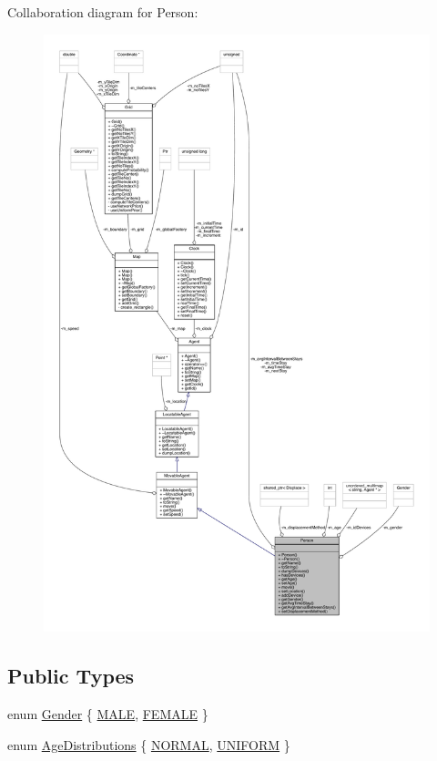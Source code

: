 Collaboration diagram for Person\+:
\nopagebreak
\begin{figure}[H]
\begin{center}
\leavevmode
\includegraphics[width=350pt]{class_person__coll__graph}
\end{center}
\end{figure}
\subsection*{Public Types}
\begin{DoxyCompactItemize}
\item 
enum \mbox{\hyperlink{class_person_aff84ca16bd4dbf364614d86f20b29dd2}{Gender}} \{ \mbox{\hyperlink{class_person_aff84ca16bd4dbf364614d86f20b29dd2a16691f7cc6595f87b71d9b43ad23fcb4}{M\+A\+LE}}, 
\mbox{\hyperlink{class_person_aff84ca16bd4dbf364614d86f20b29dd2a8ee21010fb2d8e8794ef72be368da064}{F\+E\+M\+A\+LE}}
 \}
\item 
enum \mbox{\hyperlink{class_person_a53376a9a5852ec7760488a01c37f0b0b}{Age\+Distributions}} \{ \mbox{\hyperlink{class_person_a53376a9a5852ec7760488a01c37f0b0ba7e4e1da74c9858476e0149deef9458c4}{N\+O\+R\+M\+AL}}, 
\mbox{\hyperlink{class_person_a53376a9a5852ec7760488a01c37f0b0ba4cf35976a167c4ac001a3eed2920a9b0}{U\+N\+I\+F\+O\+RM}}
 \}
\end{DoxyCompactItemize}
